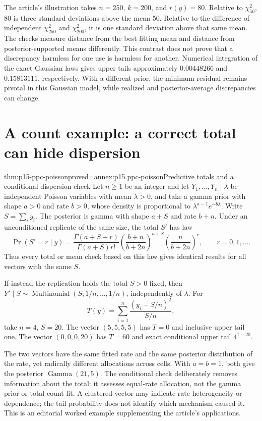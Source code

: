 The article's illustration takes \(n=250\), \(k=200\), and
\(r(y)=80\). Relative to \(\chi^2_{50}\), 80 is three standard
deviations above the mean 50. Relative to the difference of independent
\(\chi^2_{250}\) and \(\chi^2_{200}\), it is one standard deviation
above that same mean. The checks measure distance from the best fitting
mean and distance from posterior-supported means differently. This contrast
does not prove that a discrepancy harmless for one use is harmless for another.
Numerical integration of the exact Gaussian laws gives upper tails
approximately \(0.00448266\) and \(0.15813111\), respectively.
With a different prior, the minimum residual remains pivotal in this Gaussian
model, while realized and posterior-average discrepancies can change.

\section{A count example: a correct total can hide dispersion}
\label{sec:p15-ppc-counts}

\begin{hbtheorem}{thm:p15-ppc-poisson}{proved=annex:p15.ppc-poisson}{Predictive totals and a conditional dispersion check}
Let \(n\geq1\) be an integer and let \(Y_1,\ldots,Y_n\mid\lambda\) be independent Poisson variables
with mean \(\lambda>0\), and take a gamma prior with shape \(a>0\)
and rate \(b>0\), whose density is proportional to
\(\lambda^{a-1}e^{-b\lambda}\). Write \(S=\sum_i y_i\).
The posterior is gamma with shape \(a+S\) and rate \(b+n\). Under
an unconditioned replicate of the same size, the total \(S'\) has law
\[
 \Pr(S'=r\mid y)=
 \frac{\Gamma(a+S+r)}{\Gamma(a+S)r!}
 \left(\frac{b+n}{b+2n}\right)^{a+S}
 \left(\frac n{b+2n}\right)^r,
 \qquad r=0,1,\ldots.
\]
Thus every total or mean check based on this law gives identical results
for all vectors with the same \(S\).

If instead the replication holds the total \(S>0\) fixed, then
\(Y'\mid S\sim\operatorname{Multinomial}(S;1/n,\ldots,1/n)\),
independently of \(\lambda\). For
\[
 T(y)=\sum_{i=1}^n\frac{(y_i-S/n)^2}{S/n},
\]
take \(n=4\), \(S=20\). The vector \((5,5,5,5)\) has \(T=0\)
and inclusive upper tail one. The vector \((0,0,0,20)\) has \(T=60\)
and exact conditional upper tail \(4^{1-20}\).
\end{hbtheorem}

The two vectors have the same fitted rate and the same posterior distribution
of the rate, yet radically different allocations across cells. With
\(a=b=1\), both give the posterior \(\operatorname{Gamma}(21,5)\).
The conditional check deliberately removes information about the total:
it assesses equal-rate allocation, not the gamma prior or total-count fit.
A clustered vector may indicate rate heterogeneity or dependence; the tail
probability does not identify which mechanism caused it. This is an editorial
worked example supplementing the article's applications.

